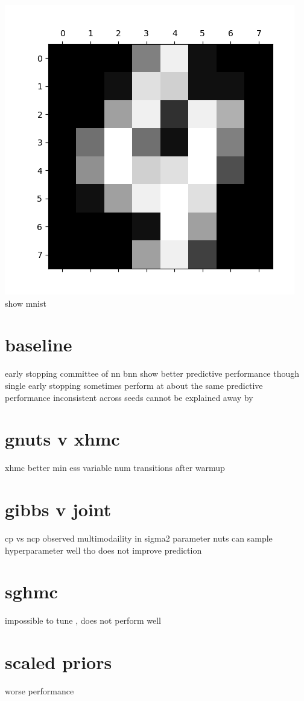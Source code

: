 \documentclass[]{report}
\begin{document}
\includegraphics{mnist1.png}
show mnist

\section{baseline}
early stopping committee of nn 
bnn show better predictive performance 
though single early stopping sometimes perform at about the same predictive performance inconsistent across seeds 
cannot be explained away by 
\section{gnuts v xhmc}
xhmc better min ess 
variable num transitions after warmup
\section{gibbs v joint}
cp vs ncp 
observed multimodaility in sigma2 parameter 
nuts can sample hyperparameter well tho does not improve prediction

\section{sghmc}
impossible to tune , does not perform well
\section{scaled priors}
worse performance 
\end{document}
